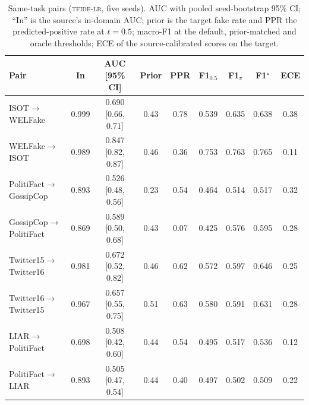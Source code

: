 \begin{table}[t]
\centering
\caption{Same-task pairs (\textsc{tfidf-lr}, five seeds). AUC with pooled seed-bootstrap 95\% CI; ``In'' is the source's in-domain AUC; prior is the target fake rate and PPR the predicted-positive rate at $t=0.5$; macro-F1 at the default, prior-matched and oracle thresholds; ECE of the source-calibrated scores on the target.}\label{tab:pairs}
\small
\begin{tabular}{@{}lcccccccc@{}}
\toprule
Pair & In & AUC [95\% CI] & Prior & PPR & F1$_{0.5}$ & F1$_{\pi}$ & F1$^\star$ & ECE \\
\midrule
ISOT$\to$WELFake & 0.999 & 0.690 [0.66, 0.71] & 0.43 & 0.78 & 0.539 & 0.635 & 0.638 & 0.38 \\
WELFake$\to$ISOT & 0.989 & 0.847 [0.82, 0.87] & 0.46 & 0.36 & 0.753 & 0.763 & 0.765 & 0.11 \\
PolitiFact$\to$GossipCop & 0.893 & 0.526 [0.48, 0.56] & 0.23 & 0.54 & 0.464 & 0.514 & 0.517 & 0.32 \\
GossipCop$\to$PolitiFact & 0.869 & 0.589 [0.50, 0.68] & 0.43 & 0.07 & 0.425 & 0.576 & 0.595 & 0.28 \\
Twitter15$\to$Twitter16 & 0.981 & 0.672 [0.52, 0.82] & 0.46 & 0.62 & 0.572 & 0.597 & 0.646 & 0.25 \\
Twitter16$\to$Twitter15 & 0.967 & 0.657 [0.55, 0.75] & 0.51 & 0.63 & 0.580 & 0.591 & 0.631 & 0.28 \\
LIAR$\to$PolitiFact & 0.698 & 0.508 [0.42, 0.60] & 0.44 & 0.54 & 0.495 & 0.517 & 0.536 & 0.12 \\
PolitiFact$\to$LIAR & 0.893 & 0.505 [0.47, 0.54] & 0.44 & 0.40 & 0.497 & 0.502 & 0.509 & 0.22 \\
\bottomrule
\end{tabular}
\end{table}
